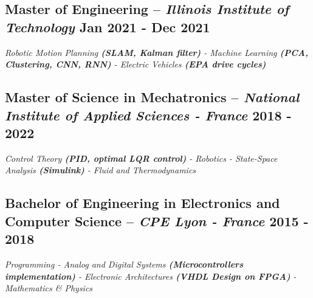 \documentclass[]{article}
\begin{document}
\normalsize
\subsection{Master of Engineering -- \textit{Illinois Institute of Technology}	\hfill \small{Jan 2021 - Dec 2021}}

\small{
\textit{Robotic Motion Planning \textbf{(SLAM, Kalman filter)} - Machine Learning \textbf{(PCA, Clustering, CNN, RNN)} - Electric Vehicles \textbf{(EPA drive cycles)} }
}

\vspace{1ex}
\normalsize
\subsection{Master of Science in Mechatronics -- \textit{National Institute of Applied Sciences - France} \hfill \small{2018 - 2022}}

\small{
\textit{Control Theory \textbf{(PID, optimal LQR control)} - Robotics - State-Space Analysis \textbf{(Simulink)} - Fluid and Thermodynamics} 
}%

\vspace{1ex}
\normalsize
\subsection{Bachelor of Engineering in Electronics and Computer Science -- \textit{CPE Lyon - France} \hfill	\small{2015 - 2018}}

\small{
\textit{Programming - Analog and Digital Systems \textbf{(Microcontrollers implementation)} - Electronic Architectures \textbf{(VHDL Design on FPGA)} - Mathematics \& Physics}
}
\end{document}
